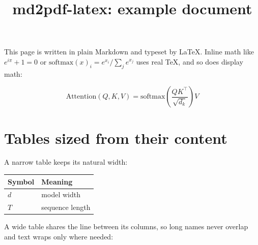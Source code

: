 \documentclass[
  11pt,
]{article}
\title{md2pdf-latex: example document}
\author{}
\date{}
\newcounter{none} %
\begin{document}
\maketitle

This page is written in plain Markdown and typeset by LaTeX. Inline math
like \(e^{i\pi} + 1 = 0\) or
\(\mathrm{softmax}(x)_i = e^{x_i} / \sum_j e^{x_j}\) uses real TeX, and
so does display math:

\[\mathrm{Attention}(Q, K, V) = \mathrm{softmax}\!\left(\frac{QK^\top}{\sqrt{d_k}}\right) V\]

\section{Tables sized from their
content}\label{tables-sized-from-their-content}

A narrow table keeps its natural width:

{\def\LTcaptype{none} %
\begin{longtable}[]{@{}ll@{}}
\toprule\noalign{}
Symbol & Meaning \\
\midrule\noalign{}
\endhead
\bottomrule\noalign{}
\endlastfoot
\(d\) & model width \\
\(T\) & sequence length \\
\end{longtable}
}

A wide table shares the line between its columns, so long names never
overlap and text wraps only where needed:

\begingroup\small
\end{document}
